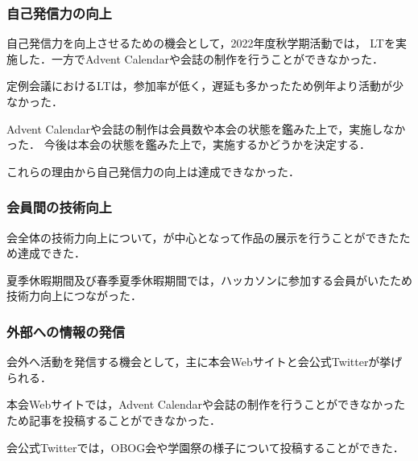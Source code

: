 \subsubsection*{自己発信力の向上}
    自己発信力を向上させるための機会として，2022年度秋学期活動では，
    LTを実施した．一方でAdvent Calendarや会誌の制作を行うことができなかった．

    定例会議におけるLTは，参加率が低く，遅延も多かったため例年より活動が少なかった．

    Advent Calendarや会誌の制作は会員数や本会の状態を鑑みた上で，実施しなかった．
    今後は本会の状態を鑑みた上で，実施するかどうかを決定する．

    これらの理由から自己発信力の向上は達成できなかった．

\subsubsection*{会員間の技術向上}
    会全体の技術力向上について，\secondGrade{}が中心となって作品の展示を行うことができたため達成できた．

    夏季休暇期間及び春季夏季休暇期間では，ハッカソンに参加する会員がいたため技術力向上につながった．

\subsubsection*{外部への情報の発信}
    会外へ活動を発信する機会として，主に本会Webサイトと会公式Twitterが挙げられる．

    本会Webサイトでは，Advent Calendarや会誌の制作を行うことができなかったため記事を投稿することができなかった．

    会公式Twitterでは，OBOG会や学園祭の様子について投稿することができた．
    